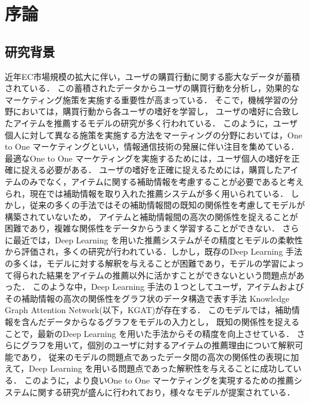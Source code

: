 ﻿\chapter{序論}

\section{研究背景}
近年EC市場規模の拡大に伴い，ユーザの購買行動に関する膨大なデータが蓄積されている．
この蓄積されたデータからユーザの購買行動を分析し，効果的なマーケティング施策を実施する重要性が高まっている．
そこで，機械学習の分野においては，購買行動から各ユーザの嗜好を学習し，
ユーザの嗜好に合致したアイテムを推薦するモデルの研究が多く行われている．
このように，ユーザ個人に対して異なる施策を実施する方法をマーティングの分野においては，One to One マーケティングといい，情報通信技術の発展に伴い注目を集めている．
最適なOne to One マーケティングを実施するためには，ユーザ個人の嗜好を正確に捉える必要がある．
ユーザの嗜好を正確に捉えるためには，購買したアイテムのみでなく，アイテムに関する補助情報を考慮することが必要であると考えられ，現在では補助情報を取り入れた推薦システムが多く用いられている\cite{rendle2010factorization}．
しかし，従来の多くの手法ではその補助情報間の既知の関係性を考慮してモデルが構築されていないため，
アイテムと補助情報間の高次の関係性を捉えることが困難であり，複雑な関係性をデータからうまく学習することができない．
さらに最近では，Deep Learning を用いた推薦システムがその精度とモデルの柔軟性から評価され，多くの研究が行われている\cite{2019DeepRecSurvey}．しかし，既存のDeep Learning 手法の多くは，モデルに対する解釈を与えることが困難であり，モデルの学習によって得られた結果をアイテムの推薦以外に活かすことができないという問題点があった．
このような中，Deep Learning 手法の１つとしてユーザ，アイテムおよびその補助情報の高次の関係性をグラフ状のデータ構造で表す手法
Knowledge Graph Attention Network(以下，KGAT)\cite{KGAT19}が存在する．
このモデルでは，補助情報を含んだデータからなるグラフをモデルの入力とし，
既知の関係性を捉えることで，最新のDeep Learning を用いた手法からその精度を向上させている．
さらにグラフを用いて，個別のユーザに対するアイテムの推薦理由について解釈可能であり，
従来のモデルの問題点であったデータ間の高次の関係性の表現に加えて，Deep Learning を用いる問題点であった解釈性を与えることに成功している．
このように，より良いOne to One マーケティングを実現するための推薦システムに関する研究が盛んに行われており，様々なモデルが提案されている．

